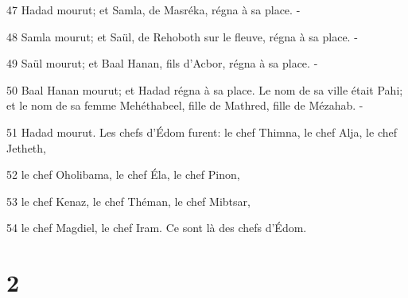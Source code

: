 \par 47 Hadad mourut; et Samla, de Masréka, régna à sa place. -
\par 48 Samla mourut; et Saül, de Rehoboth sur le fleuve, régna à sa place. -
\par 49 Saül mourut; et Baal Hanan, fils d'Acbor, régna à sa place. -
\par 50 Baal Hanan mourut; et Hadad régna à sa place. Le nom de sa ville était Pahi; et le nom de sa femme Mehéthabeel, fille de Mathred, fille de Mézahab. -
\par 51 Hadad mourut. Les chefs d'Édom furent: le chef Thimna, le chef Alja, le chef Jetheth,
\par 52 le chef Oholibama, le chef Éla, le chef Pinon,
\par 53 le chef Kenaz, le chef Théman, le chef Mibtsar,
\par 54 le chef Magdiel, le chef Iram. Ce sont là des chefs d'Édom.

\chapter{2}


